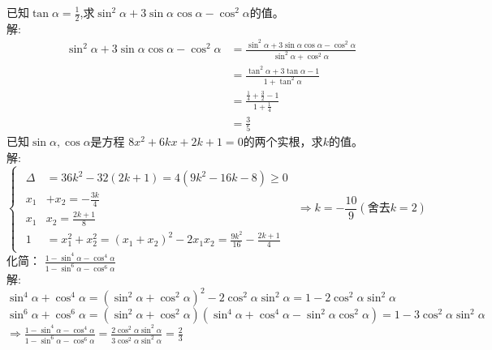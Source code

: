 \documentclass[12pt,answers]{exam}
\begin{document}
\begin{questions}
\question 
已知$\displaystyle \tan{\alpha}=\frac{1}{2}$,求$\sin^2{\alpha}+3\sin{\alpha}\cos{\alpha}-\cos^2{\alpha}$的值。\\
解:
\begin{equation*}
\begin{split}
\sin^2{\alpha}+3\sin{\alpha}\cos{\alpha}-\cos^2{\alpha}&=\frac{\sin^2{\alpha}+3\sin{\alpha}\cos{\alpha}-\cos^2{\alpha}}{\sin^2{\alpha}+\cos^2{\alpha}}\\
																				  &= \frac{\tan^2{\alpha}+3\tan{\alpha}-1}{1+\tan^2{\alpha}}\\
                                                       & =\frac{\frac{1}{4}+\frac{3}{2}-1}{1+\frac{1}{4}}\\
																					&=\frac{3}{5}
\end{split}
\end{equation*}
\question 
已知$\sin{\alpha},\cos{\alpha}$是方程 $8x^2+6kx+2k+1=0$的两个实根，求$k$的值。\\
解:\\
\begin{equation*}
\begin{cases}
\begin{split}
\Delta& =36k^2 -32(2k+1) =4(9k^2-16k-8)\ge 0 \\
x_1& +x_2= -\frac{3k}{4} \\
x_1& x_2 =\frac{2k+1}{8}\\
1&=x_1^2 +x_2^2=(x_1+x_2)^2-2x_1x_2 =\frac{9k^2}{16}-\frac{2k+1}{4}
\end{split}
\end{cases}
\Rightarrow k=-\frac{10}{9}(\text{舍去}k=2)
\end{equation*}
\question 
化简： $\displaystyle \frac{1-\sin^4{\alpha}-\cos^4{\alpha}}{1-\sin^6{\alpha}-\cos^6{\alpha}}$\\ 
解:\\
$\displaystyle \sin^4{\alpha}+\cos^4{\alpha} =(\sin^2{\alpha}+\cos^2{\alpha})^2 -2\cos^2{\alpha}\sin^2{\alpha} = 1-2\cos^2{\alpha}\sin^2{\alpha}$ \\
$\displaystyle \sin^6{\alpha}+\cos^6{\alpha} =(\sin^2{\alpha}+\cos^2{\alpha})(\sin^4{\alpha}+\cos^4{\alpha}-\sin^2{\alpha}\cos^2{\alpha})= 1-3\cos^2{\alpha}\sin^2{\alpha}$\\
$\displaystyle \Rightarrow \frac{1-\sin^4{\alpha}-\cos^4{\alpha}}{1-\sin^6{\alpha}-\cos^6{\alpha}}=\frac{2\cos^2{\alpha}\sin^2{\alpha}}{3\cos^2{\alpha}\sin^2{\alpha}}=\frac{2}{3}$

\end{questions}
\end{document}
